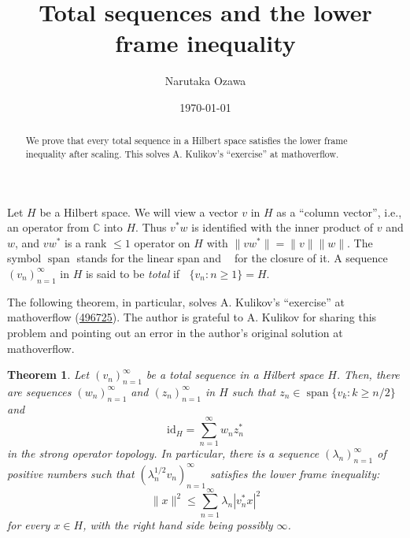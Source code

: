 \documentclass[12pt,nosumlimits,nonamelimits]{amsart}
\title{Total sequences and the lower frame inequality}
\author{Narutaka Ozawa}
\date{\today}
\newtheorem*{thm*}{Theorem}
\newcommand{\id}{\mathrm{id}}
\DeclareMathOperator{\lh}{span}
\DeclareMathOperator{\clh}{\overline{span}}
\begin{document}
\begin{abstract}
We prove that every total sequence in a Hilbert space 
satisfies the lower frame inequality after scaling. 
This solves A. Kulikov's ``exercise'' at mathoverflow. 
\end{abstract}
%
\maketitle
%
Let $H$ be a Hilbert space. 
We will view a vector $v$ in $H$ 
as a ``column vector'', i.e., an operator 
from $\mathbb{C}$ into $H$. 
Thus $v^*w$ is identified with 
the inner product of $v$ and $w$, 
and $vw^*$ is a rank $\le1$ operator on $H$ 
with $\|vw^*\|=\|v\|\|w\|$. 
The symbol $\lh$ stands for the linear span and $\clh$ 
for the closure of it. 
A sequence $(v_n)_{n=1}^\infty$ in 
$H$ is said to be \emph{total} if 
$\clh\{ v_n : n\geq1\}=H$. 

The following theorem, in particular, solves A. Kulikov's ``exercise'' 
at mathoverflow 
(\href{https://mathoverflow.net/questions/496725/}{496725}). 
The author is grateful to A. Kulikov for sharing this problem 
and pointing out an error in the author's original 
solution at mathoverflow. 

\begin{thm*}
Let $( v_n )_{n=1}^\infty$ be a total sequence in a Hilbert space $H$. 
Then, there are sequences $(w_n)_{n=1}^\infty$ and $(z_n)_{n=1}^\infty$ 
in $H$ such that $z_n\in\lh\{ v_k : k\geq n/2\}$ and 
$$\id_H=\sum_{n=1}^\infty w_nz_n^*$$
in the strong operator topology. 
In particular, 
there is a sequence $(\lambda_n)_{n=1}^\infty$ 
of positive numbers such that $(\lambda_n^{1/2}v_n)_{n=1}^\infty$
satisfies the lower frame inequality: 
\[
\| x\|^2 \le \sum_{n=1}^\infty\lambda_n |v_n^*x|^2 
\]
for every $x\in H$, with the right hand side being possibly $\infty$.
\end{thm*}
\end{document}
